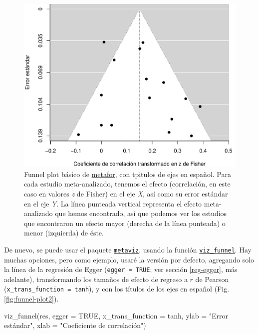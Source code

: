 \documentclass[
  bookmarksnumbered]{article}
\newenvironment{Shaded}{\begin{snugshade}}{\end{snugshade}}
\newcommand{\AttributeTok}[1]{\textcolor[rgb]{0.00,0.34,0.68}{#1}}
\newcommand{\ConstantTok}[1]{\textcolor[rgb]{0.67,0.33,0.00}{#1}}
\newcommand{\FunctionTok}[1]{\textcolor[rgb]{0.39,0.29,0.61}{#1}}
\newcommand{\NormalTok}[1]{\textcolor[rgb]{0.12,0.11,0.11}{#1}}
\newcommand{\StringTok}[1]{\textcolor[rgb]{0.75,0.01,0.01}{#1}}
\begin{document}
\begin{figure}
\centering
\includegraphics{Meta-analysis_files/figure-latex/funnel-plot1a-1.pdf}
\caption{\label{fig:funnel-plot1a}Funnel plot básico de \href{https://www.metafor-project.org/doku.php}{metafor}, con tpitulos de ejes en español. Para cada estudio meta-analizado, tenemos el efecto (correlación, en este caso en valores \emph{z} de Fisher) en el eje \emph{X}, así como su error estándar en el eje \emph{Y}. La línea punteada vertical representa el efecto meta-analizado que hemos encontrado, así que podemos ver los estudios que encontraron un efecto mayor (derecha de la línea punteada) o menor (izquierda) de éste.}
\end{figure}

De nuevo, se puede usar el paquete \href{https://cran.r-project.org/web/packages/metaviz/vignettes/metaviz.html}{\texttt{metaviz}}, usando la función \href{https://cran.r-project.org/web/packages/metaviz/vignettes/metaviz.html\#creating-funnel-plots-with-viz_funnel}{\texttt{viz\_funnel}}. Hay muchas opciones, pero como ejemplo, usaré la versión por defecto, agregando solo la línea de la regresión de Egger (\texttt{egger\ =\ TRUE}; ver sección \ref{reg-egger}, más adelante), transformando los tamaños de efecto de regreso a \(r\) de Pearson (\texttt{x\_trans\_function\ =\ tanh}), y con los títulos de los ejes en español (Fig. \ref{fig:funnel-plot2}).

\begin{Shaded}
\begin{Highlighting}[]
\FunctionTok{viz\_funnel}\NormalTok{(res, }
           \AttributeTok{egger =} \ConstantTok{TRUE}\NormalTok{,}
           \AttributeTok{x\_trans\_function =}\NormalTok{ tanh,}
           \AttributeTok{ylab =} \StringTok{"Error estándar"}\NormalTok{,}
           \AttributeTok{xlab =} \StringTok{"Coeficiente de correlación"}\NormalTok{)}
\end{Highlighting}
\end{Shaded}
\end{document}
